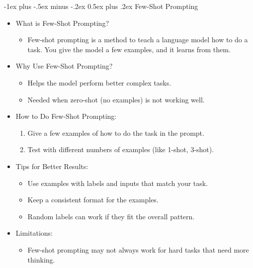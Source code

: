 \documentclass[10pt,landscape]{article}
\makeatletter
\renewcommand{\section}{\@startsection{section}{1}{0mm}%
                                {-1ex plus -.5ex minus -.2ex}%
                                {0.5ex plus .2ex}%
                                {\normalfont\large\bfseries}}
\makeatother
\begin{document}
\begin{multicols}{3}
\section{Few-Shot Prompting}
\begin{itemize}
    \item What is Few-Shot Prompting?
    \begin{itemize}
        \item Few-shot prompting is a method to teach a language model how to do a task. You give the model a few examples, and it learns from them.
    \end{itemize}
    \item Why Use Few-Shot Prompting?
    \begin{itemize}
        \item Helps the model perform better complex tasks.
        \item Needed when zero-shot (no examples) is not working well.
    \end{itemize}
    \item How to Do Few-Shot Prompting:
    \begin{enumerate}
        \item Give a few examples of how to do the task in the prompt.
        \item Test with different numbers of examples (like 1-shot, 3-shot).
    \end{enumerate}
    \item Tips for Better Results:
    \begin{itemize}
        \item Use examples with labels and inputs that match your task.
        \item Keep a consistent format for the examples.
        \item Random labels can work if they fit the overall pattern.
    \end{itemize}
    \item Limitations:
    \begin{itemize}
        \item Few-shot prompting may not always work for hard tasks that need more thinking.
    \end{itemize}
\end{itemize}


\end{multicols}
\end{document}
